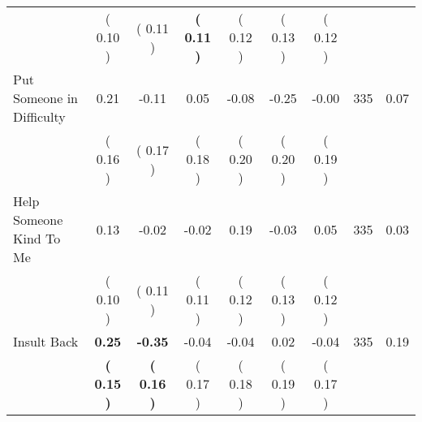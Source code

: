 \begin{tabular}{lcccccccc}
 & (     0.10 ) & (     0.11 ) & \textbf{(     0.11 )} & (     0.12 ) & (     0.13 ) & (     0.12 ) & \\
Put Someone in Difficulty &      0.21 &     -0.11 &      0.05 &     -0.08 &     -0.25 &     -0.00 & 335 &       0.07 \\ 
 & (     0.16 ) & (     0.17 ) & (     0.18 ) & (     0.20 ) & (     0.20 ) & (     0.19 ) & \\
Help Someone Kind To Me &      0.13 &     -0.02 &     -0.02 &      0.19 &     -0.03 &      0.05 & 335 &       0.03 \\ 
 & (     0.10 ) & (     0.11 ) & (     0.11 ) & (     0.12 ) & (     0.13 ) & (     0.12 ) & \\
Insult Back & \textbf{     0.25} & \textbf{    -0.35} &     -0.04 &     -0.04 &      0.02 &     -0.04 & 335 &       0.19 \\ 
 & \textbf{(     0.15 )} & \textbf{(     0.16 )} & (     0.17 ) & (     0.18 ) & (     0.19 ) & (     0.17 ) & \\
\bottomrule
\end{tabular}

